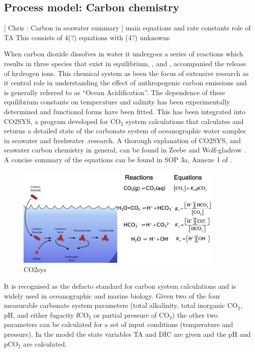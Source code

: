 \documentclass{ruthesis}
\begin{document}
\FloatBarrier
\subsection{Process model: Carbon chemistry}

[ Chris : Carbon in seawater summary ]
main equations and rate constants
role of TA
This consists of 4(?) equations with (4?) unknowns

When carbon dioxide dissolves in water it undergoes a series of reactions which results in three species that exist in equilibrium, ,  and , accompanied  the release of hydrogen ions.  
This chemical system as been the focus of extensive research as it central role in understanding the effect of anthropogenic carbon emissions and is generally referred to as ``Ocean Acidification''.  
The dependence of these equilibrium constants on temperature and salinity has been experimentally determined and functional forms have been fitted.  
This has been integrated into  CO2SYS, a program developed for CO$_2$ system calculations that calculates and returns a detailed state of the carbonate system of oceanographic water samples in seawater and freshwater \cite{lewis1998program}.research.
A thorough explanation of CO2SYS, and seawater carbon chemistry in general, can be found in  Zeebe and Wolf-gladrow \cite{zeebe2001co2}.  A concise summary of the equations can be found in SOP 3a, Annexe 1 of \cite{dickson2007guide}.
 
\begin{figure}[h]
	\centerline{\includegraphics[width=0.9\textwidth]{images_microalgae/CO2sys}}
	\caption[.]{CO2sys}
	\label{fig:CO2sys}
\end{figure}

It is recognised as the defacto standard for carbon system calculations and is widely used in oceanographic and marine biology. 
Given two of the four measurable carbonate system parameters (total alkalinity, total inorganic CO$_2$, pH, and either fugacity fCO$_2$ or partial pressure of CO$_2$) the other two parameters can be calculated for a set of input conditions (temperature and pressure).  In the model the state variables TA and DIC are given and the pH and pCO$_2$ are calculated. 
\end{document}
